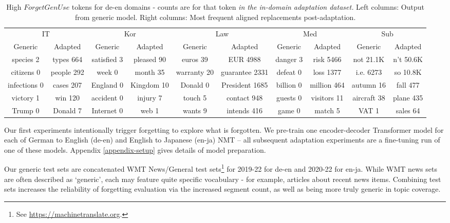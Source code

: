 \documentclass[11pt]{article}
\begin{document}
\begin{table*}[t]
    \centering
   \small 
       \setlength{\tabcolsep}{2pt}

    \begin{tabular}{cc|cc|cc|cc|cc}
    \multicolumn{2}{c|}{IT} &\multicolumn{2}{c|}{Kor} &\multicolumn{2}{c|}{Law} &\multicolumn{2}{c|}{Med} &\multicolumn{2}{c}{Sub}    \\
        Generic &Adapted & Generic&Adapted &   Generic &Adapted &Generic &Adapted&  Generic &Adapted   \\
    \hline

        species 2 &types 664&satisfied 3&pleased 90&euros 39 &EUR 4988&danger 3 &risk 5466&not 21.1K&n't 50.6K\\
    citizens 0&people 292    &week 0&month 35&warranty 20&guarantee 2331&defeat 0&loss 1377&i.e. 6273&so 10.8K\\
        infections 0&cases 207&England 0&Kingdom 10&Donald 0&President 1685&billion 0&million 464&autumn 16&fall 477\\
       victory 1 &win 120 &accident 0&injury 7&touch 5&contact 948&guests 0&visitors 11&aircraft 38&plane 435\\
        Trump 0& Donald 7&Internet 0 &web 1&     wants 9&intends 416& game 0&match 5&VAT 1&sales 64\\
       
    \end{tabular}
    \caption{High $ForgetGenUse$ tokens for  de-en domains - counts are for that token \emph{in the in-domain adaptation dataset.} Left columns: Output from generic model. Right columns: Most frequent aligned replacements post-adaptation.} %
    \label{tab:termshift-examples}
\end{table*}
Our first experiments intentionally trigger forgetting  to explore what is forgotten. We pre-train one encoder-decoder Transformer model for each of German to English (de-en) and English to Japanese (en-ja) NMT -- all subsequent adaptation experiments are a fine-tuning run of one of these models. Appendix \ref{appendix-setup} gives details of model preparation.

Our generic test sets are concatenated WMT News/General test sets\footnote{See \url{https://machinetranslate.org}.} for 2019-22 for de-en and 2020-22 for en-ja.  While WMT news sets are often described as `generic', each may feature quite specific vocabulary - for example, articles about recent news items. Combining test sets increases the reliability of forgetting evaluation via the increased segment count, as well as being more truly generic in topic coverage. 
\end{document}
